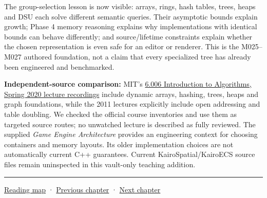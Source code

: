 The group-selection lesson is now visible: arrays, rings, hash tables, trees, heaps and DSU each solve different semantic queries. Their asymptotic bounds explain growth; Phase 4 memory reasoning explains why implementations with identical bounds can behave differently; and source/lifetime constraints explain whether the chosen representation is even safe for an editor or renderer. This is the M025--M027 authored foundation, not a claim that every specialized tree has already been engineered and benchmarked.

\textbf{Independent-source comparison:} MIT's \href{https://ocw.mit.edu/courses/6-006-introduction-to-algorithms-spring-2020/video_galleries/lecture-videos/}{6.006 Introduction to Algorithms, Spring 2020 lecture recordings} include dynamic arrays, hashing, trees, heaps and graph foundations, while the 2011 lectures explicitly include open addressing and table doubling. We checked the official course inventories and use them as targeted source routes; no unwatched lecture is described as fully reviewed. The supplied \emph{Game Engine Architecture} provides an engineering context for choosing containers and memory layouts. Its older implementation choices are not automatically current C++ guarantees. Current KairoSpatial/KairoECS source files remain uninspected in this vault-only teaching addition.

\begin{center}\rule{0.5\linewidth}{0.5pt}\end{center}

\hyperref[volume-reading-map]{Reading map} · \hyperref[05-engine-i-ch006]{Previous chapter} · \hyperref[05-engine-i-ch008]{Next chapter}

